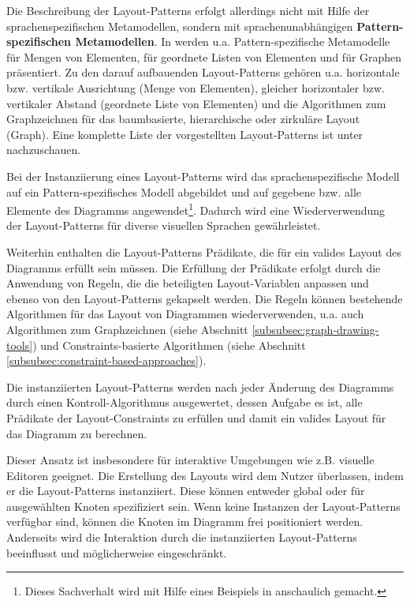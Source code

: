 Die Beschreibung der Layout-Patterns erfolgt allerdings nicht mit Hilfe der sprachenspezifischen Metamodellen, sondern mit sprachenunabhängigen \textbf{Pattern-spezifischen Metamodellen}. In \cite{Maier12A-Pattern-based} werden u.a. Pattern-spezifische Metamodelle für Mengen von Elementen, für geordnete Listen von Elementen und für Graphen präsentiert. Zu den darauf aufbauenden Layout-Patterns gehören u.a. horizontale bzw. vertikale Ausrichtung (Menge von Elementen), gleicher horizontaler bzw. vertikaler Abstand (geordnete Liste von Elementen) und die Algorithmen zum Graphzeichnen für das baumbasierte, hierarchische oder zirkuläre Layout (Graph). Eine komplette Liste der vorgestellten Layout-Patterns ist unter \cite[S.55]{Maier12A-Pattern-based} nachzuschauen.

Bei der Instanziierung eines Layout-Patterns wird das sprachenspezifische Modell auf ein Pat\-tern-spezifisches Modell abgebildet und auf gegebene bzw. alle Elemente des Diagramms angewendet\footnote{Dieses Sachverhalt wird mit Hilfe eines Beispiels in \cite[S.59ff]{Maier12A-Pattern-based} anschaulich gemacht.}. Dadurch wird eine Wiederverwendung der Layout-Patterns für diverse visuellen Sprachen gewährleistet.

Weiterhin enthalten die Layout-Patterns Prädikate, die für ein valides Layout des Diagramms erfüllt sein müssen. Die Erfüllung der Prädikate erfolgt durch die Anwendung von Regeln, die die beteiligten Layout-Variablen anpassen und ebenso von den Layout-Patterns gekapselt werden. Die Regeln können bestehende Algorithmen für das Layout von Diagrammen wiederverwenden, u.a. auch Algorithmen zum Graphzeichnen (siehe Abschnitt \ref{subsubsec:graph-drawing-tools}) und Constraints-basierte Algorithmen (siehe Abschnitt \ref{subsubsec:constraint-based-approaches}).

Die instanziierten Layout-Patterns werden nach jeder Änderung des Diagramms durch einen Kontroll-Algorithmus ausgewertet, dessen Aufgabe es ist, alle Prädikate der Layout-Constraints zu erfüllen und damit ein valides Layout für das Diagramm zu berechnen.

Dieser Ansatz ist insbesondere für interaktive Umgebungen wie z.B. visuelle Editoren geeignet. Die Erstellung des Layouts wird dem Nutzer überlassen, indem er die Layout-Patterns instanziiert. Diese können entweder global oder für ausgewählten Knoten spezifiziert sein. Wenn keine Instanzen der Layout-Patterns verfügbar sind, können die Knoten im Diagramm frei positioniert werden. Anderseits wird die Interaktion durch die instanziierten Layout-Patterns beeinflusst und möglicherweise eingeschränkt.

